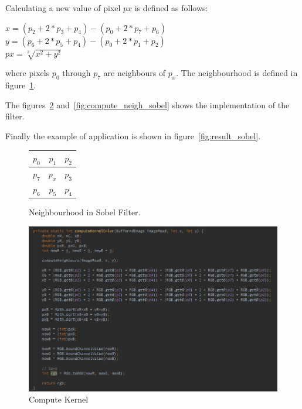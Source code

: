 \documentclass{article}
\begin{document}
Calculating a new value of pixel $px$ is defined as follows:
\begin{center}
	$x = (p_2 + 2*p_3 + p_4) - (p_0 + 2*p_7 + p_6)$\\
	$y = (p_6 + 2*p_5 + p_4) - (p_0 + 2*p_1 + p_2)$\\
	$px = \sqrt[2]{x^2 + y^2}$
\end{center}

where pixels $p_0$ through $p_7$ are neighbours of $p_x$. The neighbourhood is defined in figure~\ref{fig:sobel_neigh}.

The figures~\ref{fig:compute_kernel_sobel} and~\ref{fig:compute_neigh_sobel} shows the implementation of the filter.

Finally the example of application is shown in figure~\ref{fig:result_sobel}.

%
%
\begin{figure}[H]
  \centering

	\begin{tabular}{| r | r | r |}
	\hline
		$p_0$ & $p_1$ & $p_2$ \\
	\hline
		$p_7$ & $p_x$ & $p_3$ \\
	\hline
		$p_6$ & $p_5$ & $p_4$ \\
	\hline

	\end{tabular}
  
  {
  \caption{Neighbourhood in Sobel Filter.}
  \label{fig:sobel_neigh}
  }

\end{figure}


%
%
\begin{figure}[H]
\centering

  \includegraphics[width=0.9\linewidth]{res/algorithms/computeKernel_sobel.png}
  
\caption{Compute Kernel}
\label{fig:compute_kernel_sobel}
\end{figure}
\end{document}
